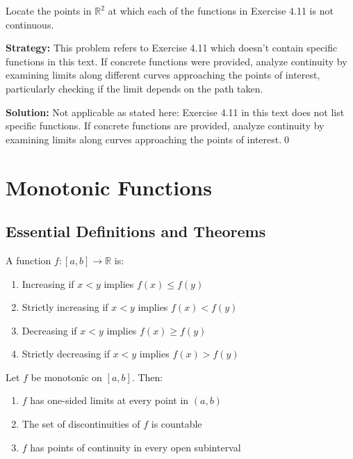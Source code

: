 \begin{problembox}
Locate the points in $\mathbb{R}^2$ at which each of the functions in Exercise 4.11 is not continuous.
\end{problembox}

\noindent\textbf{Strategy:} This problem refers to Exercise 4.11 which doesn't contain specific functions in this text. If concrete functions were provided, analyze continuity by examining limits along different curves approaching the points of interest, particularly checking if the limit depends on the path taken.

\bigskip\noindent\textbf{Solution:}
Not applicable as stated here: Exercise 4.11 in this text does not list specific functions. If concrete functions are provided, analyze continuity by examining limits along curves approaching the points of interest.\qed

\section{Monotonic Functions}

\subsection*{Essential Definitions and Theorems}

\begin{definition}
A function $f: [a,b] \to \mathbb{R}$ is:
\begin{enumerate}
\item Increasing if $x < y$ implies $f(x) \leq f(y)$
\item Strictly increasing if $x < y$ implies $f(x) < f(y)$
\item Decreasing if $x < y$ implies $f(x) \geq f(y)$
\item Strictly decreasing if $x < y$ implies $f(x) > f(y)$
\end{enumerate}
\end{definition}

\begin{theorem}
Let $f$ be monotonic on $[a,b]$. Then:
\begin{enumerate}
\item $f$ has one-sided limits at every point in $(a,b)$
\item The set of discontinuities of $f$ is countable
\item $f$ has points of continuity in every open subinterval
\end{enumerate}
\end{theorem}




